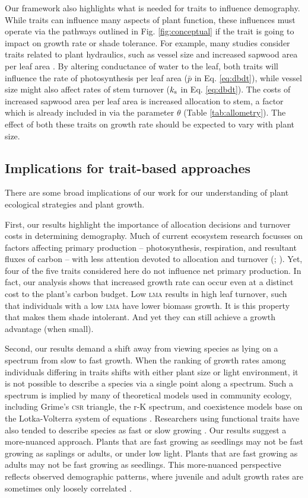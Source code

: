 \documentclass[9pt,twocolumn,twoside,lineno]{pnas-new}
\newcommand{\lma}{\textsc{lma}}
\begin{document}
Our framework also highlights what is needed for traits to influence demography. While traits can influence many aspects of plant function, these influences must operate via the pathways outlined in Fig. \ref{fig:conceptual} if the trait is going to impact on growth rate or shade tolerance. For example, many studies consider traits related to plant hydraulics, such as vessel size and increased sapwood area per leaf area \citep{Zanne-2010}. By altering conductance of water to the leaf, both traits will influence the rate of photosynthesis per leaf area ($\bar{p}$ in Eq. \ref{eq:dbdt}), while vessel size might also affect rates of stem turnover ($k_{\rm s}$ in Eq. \ref{eq:dbdt}). The costs of increased sapwood area per leaf area is increased allocation to stem, a factor which is already included in via the parameter $\theta$ (Table \ref{tab:allometry}). The effect of both these traits on growth rate should be expected to vary with plant size.

\subsection*{Implications for trait-based approaches}
There are some broad implications of our work for our understanding of plant ecological strategies and plant growth.

First, our results highlight the importance of allocation decisions and turnover costs in determining demography. Much of current ecosystem research focusses on factors affecting primary production -- photosynthesis, respiration, and resultant fluxes of carbon -- with less attention devoted to allocation and turnover (\citealp{Friend-2014}; \citealp[for comparisons of models see][]{Sitch-2008, DeKauwe-2014}). Yet, four of the five traits considered here do not influence net primary production. In fact, our analysis shows that increased growth rate can occur even at a distinct cost to the plant's carbon budget. Low {\lma} results in high leaf turnover, such that individuals with a low {\lma} have lower biomass growth. It is this property that makes them shade intolerant. And yet they can still achieve a growth advantage (when small).

Second, our results demand a shift away from viewing species as lying on a spectrum  from slow to fast growth. When the ranking of growth rates among individuals differing in traits shifts with either plant size or light environment, it is not possible to describe a species via a single point along a spectrum. Such a spectrum is implied by many of theoretical models used in community ecology, including Grime's \textsc{csr} triangle, the r-K spectrum, and coexistence models base on the Lotka-Volterra system of equations \citep[e.g.][]{Grime-1977,Chesson-2000}. Researchers using functional traits have also tended to describe species as fast or slow growing \citep{Adler-2014, Diaz-2016}. Our results suggest a more-nuanced approach. Plants that are fast growing as seedlings may not be fast growing as saplings or adults, or under low light. Plants that are fast growing as adults may not be fast growing as seedlings. This more-nuanced perspective reflects observed demographic patterns, where juvenile and adult growth rates are sometimes only loosely correlated \citep{Rees-2001}.
\end{document}
